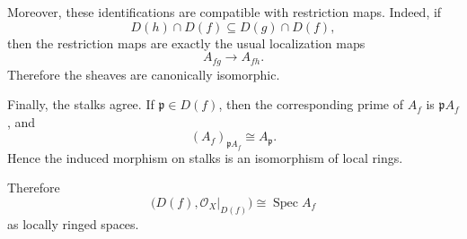 Moreover, these identifications are compatible with restriction maps. Indeed, if
\[
D(h)\cap D(f)\subseteq D(g)\cap D(f),
\]
then the restriction maps are exactly the usual localization maps
\[
A_{fg}\longrightarrow A_{fh}.
\]
Therefore the sheaves are canonically isomorphic.

Finally, the stalks agree. If \(\mathfrak p\in D(f)\), then the corresponding prime of \(A_f\) is \(\mathfrak pA_f\), and
\[
(A_f)_{\mathfrak pA_f}\cong A_{\mathfrak p}.
\]
Hence the induced morphism on stalks is an isomorphism of local rings.

Therefore
\[
\boxed{
	\bigl(D(f),\mathcal O_X|_{D(f)}\bigr)\cong \operatorname{Spec} A_f
}
\]
as locally ringed spaces.
